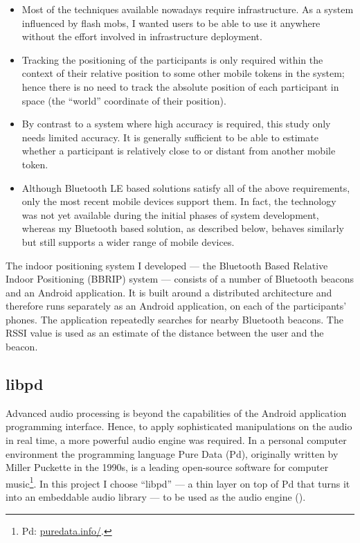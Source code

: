 \documentclass[a4paper,11pt]{article}
\begin{document}
\begin{itemize}
	\item Most of the techniques available nowadays require infrastructure.
	As a system influenced by flash mobs, I wanted users to be able to use it anywhere without the effort involved in infrastructure deployment.
	\item Tracking the positioning of the participants is only required within the context of their relative position to some other mobile tokens in the system;
  hence there is no need to track the absolute position of each participant in space (the ``world'' coordinate of their position).
	\item By contrast to a system where high accuracy is required, this study only needs limited accuracy.
  It is generally sufficient to be able to estimate whether a participant is relatively close to or distant from another mobile token.
  \item Although Bluetooth LE based solutions satisfy all of the above requirements, only the most recent mobile devices support them.
  In fact, the technology was not yet available during the initial phases of system development, whereas my Bluetooth based solution, as described below, behaves similarly but still supports a wider range of mobile devices.
\end{itemize}

The indoor positioning system I developed --- the Bluetooth Based Relative Indoor Positioning (BBRIP) system --- consists of a number of Bluetooth beacons and an Android application.
It is built around a distributed architecture and therefore runs separately as an Android application, on each of the participants' phones.
The application repeatedly searches for nearby Bluetooth beacons.
The RSSI value is used as an estimate of the distance between the user and the beacon.

\subsection{libpd}\label{methods:libpd}

Advanced audio processing is beyond the capabilities of the Android application programming interface.
Hence, to apply sophisticated manipulations on the audio in real time, a more powerful audio engine was required.
In a personal computer environment the programming language Pure Data (Pd), originally written by Miller Puckette in the 1990s, is a leading open-source software for computer music\footnote{Pd: \href{http://puredata.info/}{puredata.info/}.}.
In this project I choose ``libpd'' --- a thin layer on top of Pd that turns it into an embeddable audio library --- to be used as the audio engine (\cite[p. v]{brinkmann12}).
\end{document}
